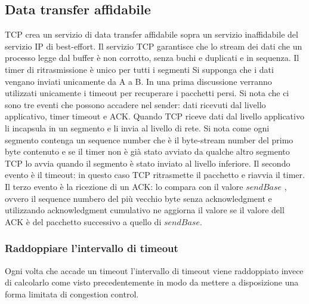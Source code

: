 \subsection{Data transfer affidabile}
TCP crea un servizio di data transfer affidabile sopra un servizio inaffidabile del servizio IP di best-effort. Il servizio TCP garantisce che lo stream dei
dati che un processo legge dal buffer \`e non corrotto, senza buchi e duplicati e in sequenza. Il timer di ritrasmissione \`e unico per tutti i segmenti Si 
supponga che i dati vengano inviati unicamente da A a B. In una prima discussione verranno utilizzati unicamente i timeout per recuperare i pacchetti persi.
Si nota che ci sono tre eventi che possono accadere nel sender: dati ricevuti dal livello applicativo, timer timeout e ACK. Quando TCP riceve dati dal
livello applicativo li incapsula in un segmento e li invia al livello di rete. Si nota come ogni segmento contenga un sequence number che \`e il byte-stream
number del primo byte contenuto e se il timer non \`e gi\`a stato avviato da qualche altro segmento TCP lo avvia quando il segmento \`e stato inviato al
livello inferiore. Il secondo evento \`e il timeout: in questo caso TCP ritrasmette il pacchetto e riavvia il timer. Il terzo evento \`e la ricezione di un 
ACK: lo compara con il valore $sendBase$ , ovvero il sequence numbero del pi\`u vecchio byte senza acknowledgment e utilizzando acknowledgment cumulativo
ne aggiorna il valore se il valore dell ACK \`e del pacchetto successivo a quello di $sendBase$. 
\subsubsection{Raddoppiare l'intervallo di timeout}
Ogni volta che accade un timeout l'intervallo di timeout viene raddoppiato invece di calcolarlo come visto precedentemente in modo da mettere a disposizione
una forma limitata di congestion control. 
